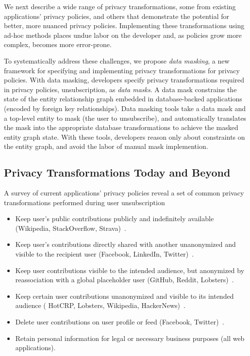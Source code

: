 We next describe a wide range of privacy transformations, some from existing applications' privacy policies,
and others that demonstrate the potential for better, more nuanced privacy policies. Implementing
these transformations using ad-hoc methods places undue labor on the developer and, as policies grow
more complex, becomes more error-prone.

To systematically address these challenges, we propose \emph{data masking}, a new framework for
specifying and implementing privacy transformations for privacy policies.
%
With data masking, developers specify privacy transformations required in privacy policies, \eg
unsubscription, as \emph{data masks}. A data mask constrains the state of the entity relationship
graph embedded in database-backed applications (\eg encoded by foreign key relationships).
%
Data masking tools take a data mask and a top-level entity to mask (\eg the user to
unsubscribe), and automatically translates the mask into the appropriate database transformations to
achieve the masked entity graph state. With these tools, developers reason only about constraints on
the entity graph, and avoid the labor of manual mask implemention.

\subsection{Privacy Transformations Today and Beyond}
A survey of current applications' privacy policies reveal a set of common privacy transformations performed during user unsubscription
\begin{itemize}[nosep]
    \item Keep user's public contributions publicly and indefinitely available (\eg Wikipedia,
        StackOverflow, Strava)~\cite{wikipedia:privacy, stackoverflow:privacy, strava:privacy}.
    \item Keep user's contributions directly shared with another unanonymized and visible to the recipient user (\eg Facebook,
        LinkedIn, Twitter)~\cite{twitter:privacy, facebook:privacy, linkedin:privacy}.
    \item Keep user contributions visible to the intended audience, but anonymized by reassociation with a global
        placeholder user (\eg GitHub, Reddit, Lobsters)~\cite{github:privacy, reddit:privacy,
        lobsters:privacy}.
    \item Keep certain user contributions unanonymized and visible to its intended audience (\eg
        HotCRP, Lobsters, Wikipedia, HackerNews)~\cite{hotcrp:privacy, lobsters:privacy,
        hackernews:privacy, wikipedia:privacy}.
    \item Delete user contributions on user profile or feed (\eg Facebook,
        Twitter)~\cite{facebook:privacy, twitter:privacy}.
    \item Retain personal information for legal or necessary business purposes (all web applications).
\end{itemize}

